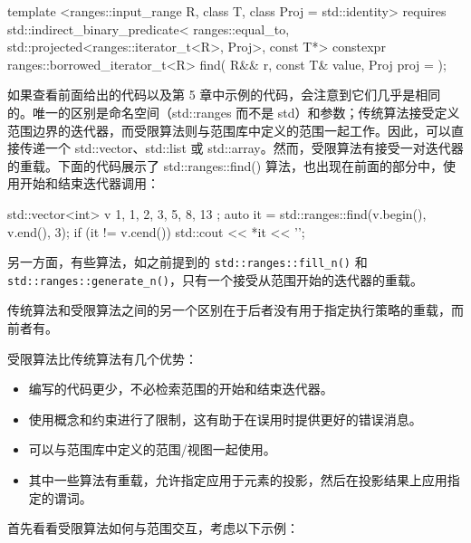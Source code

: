 \begin{cpp}
template <ranges::input_range R, class T, class Proj = std::identity>
requires std::indirect_binary_predicate<
    ranges::equal_to,
    std::projected<ranges::iterator_t<R>, Proj>,
    const T*>
constexpr ranges::borrowed_iterator_t<R>
    find( R&& r, const T& value, Proj proj = {} );
\end{cpp}

如果查看前面给出的代码以及第 5 章中示例的代码，会注意到它们几乎是相同的。唯一的区别是命名空间（std::ranges 而不是 std）和参数；传统算法接受定义范围边界的迭代器，而受限算法则与范围库中定义的范围一起工作。因此，可以直接传递一个 std::vector、std::list 或 std::array。然而，受限算法有接受一对迭代器的重载。下面的代码展示了 std::ranges::find() 算法，也出现在前面的部分中，使用开始和结束迭代器调用：

\begin{cpp}
std::vector<int> v{ 1, 1, 2, 3, 5, 8, 13 };
auto it = std::ranges::find(v.begin(), v.end(), 3);
if (it != v.cend()) std::cout << *it << '\n';
\end{cpp}

另一方面，有些算法，如之前提到的 \verb|std::ranges::fill_n()| 和 \verb|std::ranges::generate_n()|，只有一个接受从范围开始的迭代器的重载。

传统算法和受限算法之间的另一个区别在于后者没有用于指定执行策略的重载，而前者有。

受限算法比传统算法有几个优势：

\begin{itemize}
\item
编写的代码更少，不必检索范围的开始和结束迭代器。

\item
使用概念和约束进行了限制，这有助于在误用时提供更好的错误消息。

\item
可以与范围库中定义的范围/视图一起使用。

\item
其中一些算法有重载，允许指定应用于元素的投影，然后在投影结果上应用指定的谓词。
\end{itemize}

首先看看受限算法如何与范围交互，考虑以下示例：


